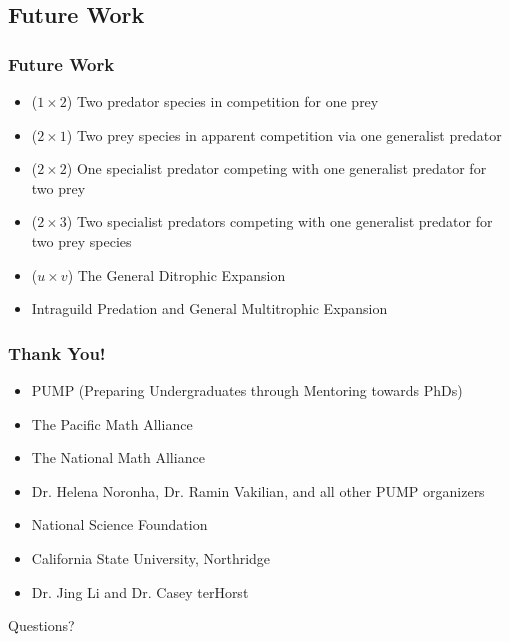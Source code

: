\documentclass[10pt]{beamer}
\begin{document}
\subsection{Future Work}
\begin{frame}
	\frametitle{Future Work}
	\begin{itemize}
		\item \large ($1\times 2$) Two predator species in competition for one prey
		\item ($2\times 1$) Two prey species in apparent competition via one generalist predator
		\item ($2\times 2$) One specialist predator competing with one generalist predator for two prey
		\item ($2\times 3$) Two specialist predators competing with one generalist predator for two prey species
		\item ($u \times v$) The General Ditrophic Expansion
		\item Intraguild Predation and General Multitrophic Expansion
	\end{itemize}
\end{frame}

\begin{frame}
	\frametitle{Thank You!}
	\begin{itemize}
		\item PUMP (Preparing Undergraduates through Mentoring towards PhDs)
		\item The Pacific Math Alliance
		\item The National Math Alliance
		\item Dr. Helena Noronha, Dr. Ramin Vakilian, and all other PUMP organizers
		\item National Science Foundation
		\item California State University, Northridge
		\item Dr. Jing Li and Dr. Casey terHorst
	\end{itemize}
	\begin{center}
		{\Huge Questions?}
	\end{center}
\end{frame}
\end{document}
